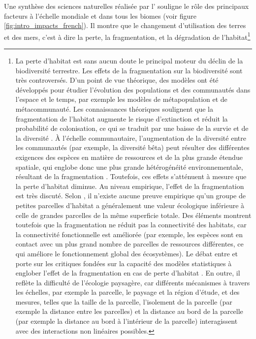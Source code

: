 Une synthèse des sciences naturelles réalisée par l'\cite{ipbes_2022_6417333} souligne le rôle des principaux facteurs à l'échelle mondiale et dans tous les biomes (voir figure \ref{fig:intro_impacts_french}).
Il montre que le changement d'utilisation des terres et des mers, c'est à dire la perte, la fragmentation, et la dégradation de  l'habitat\footnote{La perte d'habitat est sans aucun doute le principal moteur du déclin de la biodiversité terrestre. Les effets de la fragmentation sur la biodiversité sont très controversés. D'un point de vue théorique, des modèles ont été développés pour étudier l'évolution des populations et des communautés dans l'espace et le temps, par exemple les modèles de métapopulation et de métacommunauté. Les connaissances théoriques soulignent que la fragmentation de l'habitat augmente le risque d'extinction et réduit la probabilité de colonisation, ce qui se traduit par une baisse de la survie et de la diversité \citep{adler_persistence_1994,hill_habitat_1999, thompson_loss_2017}. À l'échelle communautaire, l'augmentation de la diversité entre les communautés (par exemple, la diversité bêta) peut résulter des différentes exigences des espèces en matière de ressources et de la plus grande étendue spatiale, qui englobe donc une plus grande hétérogénéité environnementale, résultant de la fragmentation \citep{lasky_reserve_2013, chisholm_species_2018}. Toutefois, ces effets s'atténuent à mesure que la perte d'habitat diminue.   Au niveau empirique, l'effet de la fragmentation est très discuté. Selon \cite{fahrig_ecological_2017}, il n'existe aucune preuve empirique qu'un groupe de petites parcelles d'habitat a généralement une valeur écologique inférieure à celle de grandes parcelles de la même superficie totale. Des éléments montrent toutefois que la fragmentation ne réduit pas la connectivité des habitats, car la connectivité fonctionnelle est améliorée (par exemple, les espèces sont en contact avec un plus grand nombre de parcelles de ressources différentes, ce qui améliore le fonctionnement global des écosystèmes). Le débat entre \cite{fletcher_is_2018} et \cite{fahrig_habitat_2019} porte sur les critiques fondées sur la capacité des modèles statistiques à englober l'effet de la fragmentation en cas de perte d'habitat \citep{ruffell_accounting_2016}. En outre, il reflète la difficulté de l'écologie paysagère, car différents mécanismes à travers les échelles, par exemple la parcelle, le paysage et la région d'étude, et des mesures, telles que la taille de la parcelle, l'isolement de la parcelle (par exemple la distance entre les parcelles) et la distance au bord de la parcelle (par exemple la distance au bord à l'intérieur de la parcelle) interagissent avec des interactions non linéaires possibles.}
